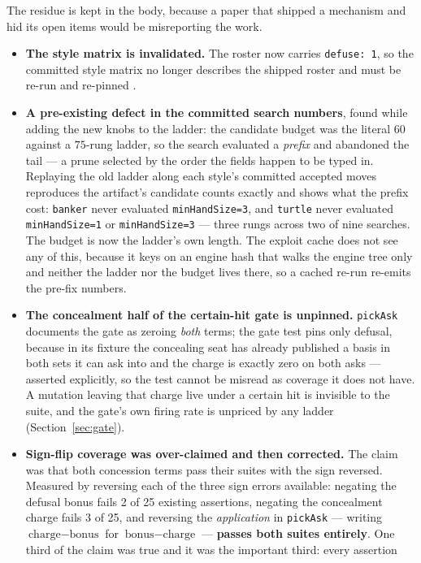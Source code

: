 \documentclass[11pt]{article}
\newcommand{\code}[1]{\texttt{#1}}
\begin{document}
The residue is kept in the body, because a paper that shipped a mechanism and hid its open items
would be misreporting the work.
\begin{itemize}
\item \textbf{The style matrix is invalidated.} The roster now carries \code{defuse: 1}, so the
  committed style matrix no longer describes the shipped roster and must be re-run and re-pinned
  \cite{styles}.
\item \textbf{A pre-existing defect in the committed search numbers}, found while adding the new
  knobs to the ladder: the candidate budget was the literal $60$ against a $75$-rung ladder, so the
  search evaluated a \emph{prefix} and abandoned the tail --- a prune selected by the order the
  fields happen to be typed in. Replaying the old ladder along each style's committed accepted moves
  reproduces the artifact's candidate counts exactly and shows what the prefix cost: \code{banker}
  never evaluated \code{minHandSize=3}, and \code{turtle} never evaluated \code{minHandSize=1} or
  \code{minHandSize=3} --- three rungs across two of nine searches. The budget is now the ladder's
  own length. The exploit cache does not see any of this, because it keys on an engine hash that
  walks the engine tree only and neither the ladder nor the budget lives there, so a cached re-run
  re-emits the pre-fix numbers.
\item \textbf{The concealment half of the certain-hit gate is unpinned.} \code{pickAsk} documents
  the gate as zeroing \emph{both} terms; the gate test pins only defusal, because in its fixture the
  concealing seat has already published a basis in both sets it can ask into and the charge is
  exactly zero on both asks --- asserted explicitly, so the test cannot be misread as coverage it
  does not have. A mutation leaving that charge live under a certain hit is invisible to the suite,
  and the gate's own firing rate is unpriced by any ladder (Section~\ref{sec:gate}).
\item \textbf{Sign-flip coverage was over-claimed and then corrected.} The claim was that both
  concession terms pass their suites with the sign reversed. Measured by reversing each of the three
  sign errors available: negating the defusal bonus fails 2 of 25 existing assertions, negating the
  concealment charge fails 3 of 25, and reversing the \emph{application} in \code{pickAsk} ---
  writing $\text{charge} - \text{bonus}$ for $\text{bonus} - \text{charge}$ --- \textbf{passes both
  suites entirely}. One third of the claim was true and it was the important third: every assertion

\end{itemize}
\end{document}
